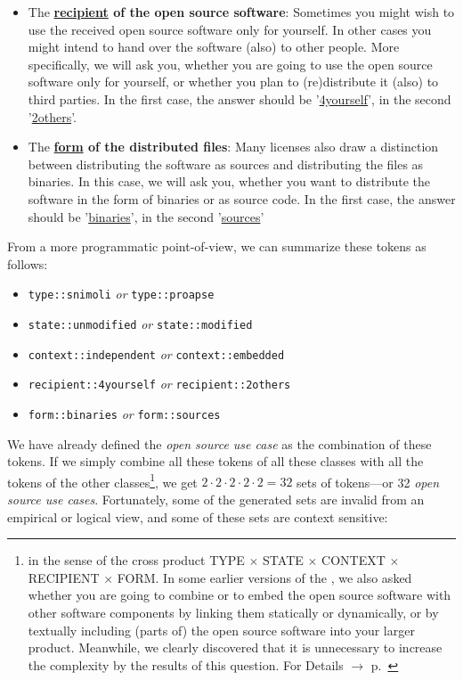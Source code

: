 \begin{itemize}
  \item The \textbf{\underline{recipient} of the open source software}:
  Sometimes you might wish to use the received open source software only for
  yourself. In other cases you might intend to hand over the software (also) to
  other people. More specifically, we will ask you, whether you are going to use
  the open source software only for yourself, or whether you plan to
  (re)distribute it (also) to third parties. In the first case, the answer
  should be '\underline{4yourself}', in the second '\underline{2others}'.
 
  \item The \textbf{\underline{form} of the distributed files}: Many licenses
  also draw a distinction between distributing the software as sources and
  distributing the files as binaries. In this case, we will ask you, whether you
  want to distribute the software in the form of binaries or as source code. In
  the first case, the answer should be '\underline{binaries}', in the second
  '\underline{sources}'
  
\end{itemize}

From a more programmatic point-of-view, we can summarize these tokens as
follows:

\begin{itemize}
  \item \texttt{type::snimoli} \emph{or} \texttt{type::proapse}
  \item \texttt{state::unmodified} \emph{or} \texttt{state::modified}
  \item \texttt{context::independent} \emph{or} \texttt{context::embedded}
  \item \texttt{recipient::4yourself} \emph{or} \texttt{recipient::2others}
  \item \texttt{form::binaries} \emph{or} \texttt{form::sources}
\end{itemize}

We have already defined the \emph{open source use case} as the combination of
these tokens. If we simply combine all these tokens of all these classes with
all the tokens of the other classes\footnote{in the sense of the cross product
TYPE $\times$ STATE $\times$ CONTEXT $\times$ RECIPIENT $\times$ FORM. In some
earlier versions of the \oslic{}, we also asked whether you are going to combine or
to embed the open source software with other software components by linking them
statically or dynamically, or by textually including (parts of) the open source
software into your larger product. Meanwhile, we clearly discovered that it is
unnecessary to increase the complexity by the results of this question. For
Details $\rightarrow$ \oslic{} p.\ \pageref{sec:LinkingSecondary}}, we get
$2 \cdot 2 \cdot 2 \cdot 2 \cdot 2 = 32$ sets of tokens---or 32 \emph{open source use cases}.
Fortunately, some of the generated sets are invalid from an empirical or logical
view, and some of these sets are context sensitive:

